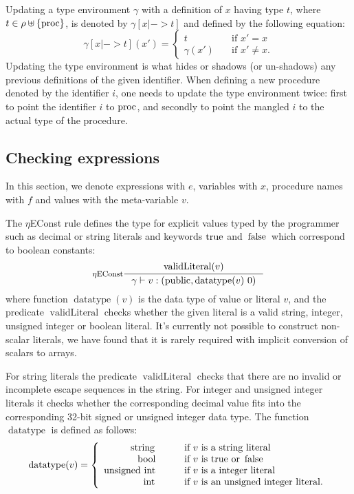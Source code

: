 \documentclass[a4paper, 10pt, draft]{report}
\newcommand{\mycode}[1]{\ensuremath{\mbox{\lstinline{#1}}}}
\begin{document}
Updating a type environment $\gamma$ with a definition of $x$ having type $t$,
where $t \in \rho \uplus \left\{\mycode{proc}\right\}$, is denoted by
$\gamma\!\left[ x |-> t \right]$ and defined by the following equation:
\[ \gamma\!\left[ x |-> t \right]\left(x'\right) = \left\{\begin{array}{ll}
    t                  & \quad \text{if $x' = x$}\\
    \gamma\!\left(x'\right) & \quad \text{if $x' \not = x$}.
  \end{array}\right.
\]
Updating the type environment is what hides or shadows (or un-shadows) any
previous definitions of the given identifier. When defining a new procedure
denoted by the identifier $i$, one needs to update the type environment twice:
first to point the identifier $i$ to \mycode{proc}, and secondly to point the
mangled $i$ to the actual type of the procedure.

\subsection{Checking expressions}\label{sec:checking:typing:expressions}

In this section, we denote expressions with $e$, variables with $x$, procedure
names with $f$ and values with the meta-variable $v$.

The $\eta$EConst rule defines the type for explicit values typed by the
programmer such as decimal or string literals and keywords \mycode{true} and
\mycode{false} which correspond to boolean constants:
\[ \inference[$\eta$EConst]{
  \operatorname{validLiteral}(v)
}{
  \gamma |- v : (\mycode{public}, \operatorname{datatype}(v)\ 0)
} \]
where function $\operatorname{datatype}\!\left(v\right)$ is the data type of
value or literal $v$, and the predicate $\operatorname{validLiteral}$ checks
whether the given literal is a valid string, integer, unsigned integer or
boolean literal. It's currently not possible to construct non-scalar literals,
we have found that it is rarely required with implicit conversion of scalars to
arrays.

For string literals the predicate $\operatorname{validLiteral}$
checks that there are no invalid or incomplete escape sequences in the string.
For integer and unsigned integer literals it checks whether the corresponding
decimal value fits into the corresponding 32-bit signed or unsigned integer
data type. The function
$\operatorname{datatype}$ is defined as follows:
\[
 \operatorname{datatype}\!\left(v\right) = \left\{\begin{array}{rll}
                                            \mycode{string} & \qquad\mbox{if $v$ is a string literal} \\
                                            \mycode{bool} & \qquad\mbox{if $v$ is \mycode{true} or \mycode{false}} \\
                                            \mycode{unsigned int} & \qquad\mbox{if $v$ is a integer literal} \\
                                            \mycode{int} & \qquad\mbox{if $v$ is an unsigned integer literal.}
                                           \end{array}\right.
\]
\end{document}
